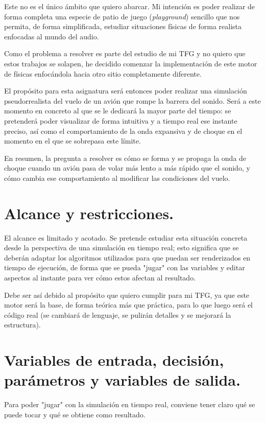 \documentclass[10.5pt]{article}
\begin{document}
	Este no es el único ámbito que quiero abarcar. Mi intención es poder realizar de forma completa una especie de patio de juego (\textit{playground}) sencillo que nos permita, de forma simplificada, estudiar situaciones físicas de forma realista enfocadas al mundo del audio.
	
	Como el problema a resolver es parte del estudio de mi TFG y no quiero que estos trabajos se solapen, he decidido comenzar la implementación de este motor de físicas enfocándola hacia otro sitio completamente diferente.
	
	El propósito para esta asignatura será entonces poder realizar una simulación pseudorrealista del vuelo de un avión que rompe la barrera del sonido. Será a este momento en concreto al que se le dedicará la mayor parte del tiempo: se pretenderá poder visualizar de forma intuitiva y a tiempo real ese instante preciso, así como el comportamiento de la onda expansiva y de choque en el momento en el que se sobrepasa este límite.
	
	En resumen, la pregunta a resolver es cómo se forma y se propaga la onda de choque cuando un avión pasa de volar más lento a más rápido que el sonido, y cómo cambia ese comportamiento al modificar las condiciones del vuelo.
	
	\section{Alcance y restricciones.}
	
	El alcance es limitado y acotado. Se pretende estudiar esta situación concreta desde la perspectiva de una simulación en tiempo real; esto significa que se deberán adaptar los algoritmos utilizados para que puedan ser renderizados en tiempo de ejecución, de forma que se pueda "jugar" con las variables y editar aspectos al instante para ver cómo estos afectan al resultado.
	
	Debe ser así debido al propósito que quiero cumplir para mi TFG, ya que este motor será la base, de forma teórica más que práctica, para lo que luego será el código real (se cambiará de lenguaje, se pulirán detalles y se mejorará la estructura). 
	
	\section{Variables de entrada, decisión, parámetros y variables de salida.}
	
	Para poder "jugar" con la simulación en tiempo real, conviene tener claro qué se puede tocar y qué se obtiene como resultado.
	
\end{document}

